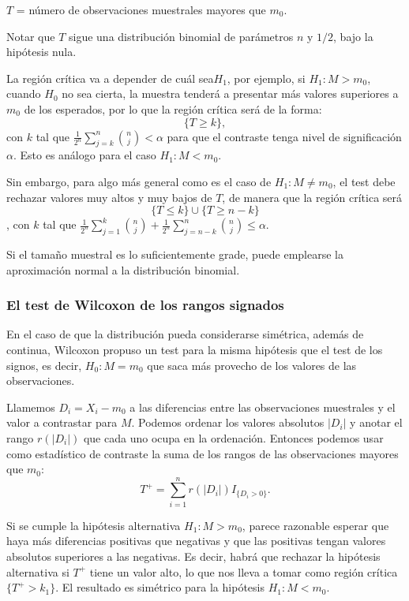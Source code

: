 \documentclass[a4paper,12pt]{article}
\begin{document}
\begin{center}
$T$ = número de observaciones muestrales mayores que $m_0$.
\end{center}

Notar que $T$ sigue una distribución binomial de parámetros $n$ y $1/2$, bajo la hipótesis nula.

La región crítica va a depender de cuál sea$H_1$, por ejemplo, si $H_1:M>m_0$, cuando $H_0$ no sea cierta, la muestra tenderá a presentar más valores superiores a $m_0$ de los esperados, por lo que la región crítica será de la forma:
$$\{T\geq k \},$$
con $k$ tal que $\frac{1}{2^n}\sum_{j=k}^{n} \binom{n}{j} < \alpha$ para que el contraste tenga nivel de significación $\alpha$. Esto es análogo para el caso $H_1: M< m_0$.

Sin embargo, para algo más general como es el caso de $H_1:M\neq m_0$, el test debe rechazar valores muy altos y muy bajos de $T$, de manera que la región crítica será $$\{T\leq k\}\cup \{T\geq n - k \}$$, con $k$ tal que $\frac{1}{2^n}\sum_{j=1}^{k} \binom{n}{j} + \frac{1}{2^n}\sum_{j=n-k}^{n} \binom{n}{j} \leq \alpha$.

Si el tamaño muestral es lo suficientemente grade, puede emplearse la aproximación normal a la distribución binomial.

\subsubsection{El test de Wilcoxon de los rangos signados}
En el caso de que la distribución pueda considerarse simétrica, además de continua, Wilcoxon propuso un test para la misma hipótesis que el test de los signos, es decir, $H_0:M =m_0$ que saca más provecho de los valores de las observaciones.

Llamemos $D_i=X_i - m_0$ a las diferencias entre las observaciones muestrales y el valor a contrastar para $M$. Podemos ordenar los valores absolutos $|D_i|$ y anotar el rango $r(|D_i|)$ que cada uno ocupa en la ordenación.  Entonces podemos usar como estadístico de contraste la suma de los rangos de las observaciones mayores que $m_0$:
$$T^+ = \sum_{i =1}^{n} r(|D_i|)I_{\{D_i>0\}}.$$

Si se cumple la hipótesis alternativa $H_1:M>m_0$, parece razonable esperar que haya más diferencias positivas que negativas y que las positivas tengan valores absolutos superiores a las negativas. Es decir, habrá que rechazar la hipótesis alternativa si $T^+$ tiene un valor alto, lo que nos lleva a tomar como región crítica $\{T^+ > k_1\}$. El resultado es simétrico para la hipótesis $H_1:M<m_0$.
\end{document}

